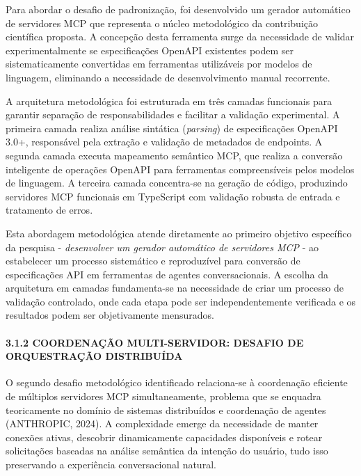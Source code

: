\documentclass[
]{article}
\begin{document}
Para abordar o desafio de padronização, foi desenvolvido um gerador
automático de servidores MCP que representa o núcleo metodológico da
contribuição científica proposta. A concepção desta ferramenta surge da
necessidade de validar experimentalmente se especificações OpenAPI
existentes podem ser sistematicamente convertidas em ferramentas
utilizáveis por modelos de linguagem, eliminando a necessidade de
desenvolvimento manual recorrente.

A arquitetura metodológica foi estruturada em três camadas funcionais
para garantir separação de responsabilidades e facilitar a validação
experimental. A primeira camada realiza análise sintática
(\emph{parsing}) de especificações OpenAPI 3.0+, responsável pela
extração e validação de metadados de endpoints. A segunda camada executa
mapeamento semântico MCP, que realiza a conversão inteligente de
operações OpenAPI para ferramentas compreensíveis pelos modelos de
linguagem. A terceira camada concentra-se na geração de código,
produzindo servidores MCP funcionais em TypeScript com validação robusta
de entrada e tratamento de erros.

Esta abordagem metodológica atende diretamente ao primeiro objetivo
específico da pesquisa - \emph{desenvolver um gerador automático de
servidores MCP} - ao estabelecer um processo sistemático e reproduzível
para conversão de especificações API em ferramentas de agentes
conversacionais. A escolha da arquitetura em camadas fundamenta-se na
necessidade de criar um processo de validação controlado, onde cada
etapa pode ser independentemente verificada e os resultados podem ser
objetivamente mensurados.

\paragraph{3.1.2 COORDENAÇÃO MULTI-SERVIDOR: DESAFIO DE ORQUESTRAÇÃO
DISTRIBUÍDA}\label{coordenauxe7uxe3o-multi-servidor-desafio-de-orquestrauxe7uxe3o-distribuuxedda}

O segundo desafio metodológico identificado relaciona-se à coordenação
eficiente de múltiplos servidores MCP simultaneamente, problema que se
enquadra teoricamente no domínio de sistemas distribuídos e coordenação
de agentes (ANTHROPIC, 2024). A complexidade emerge da necessidade de
manter conexões ativas, descobrir dinamicamente capacidades disponíveis
e rotear solicitações baseadas na análise semântica da intenção do
usuário, tudo isso preservando a experiência conversacional natural.
\end{document}

